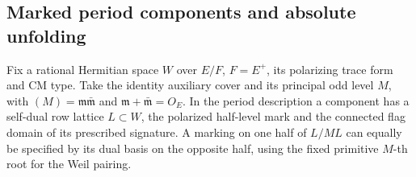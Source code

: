 \subsection{Marked period components and absolute unfolding}

Fix a rational Hermitian space \(W\) over \(E/F\), \(F=E^+\), its
polarizing trace form and CM type. Take the identity auxiliary cover
and its principal odd level \(M\), with
\((M)=\mathfrak m\bar{\mathfrak m}\) and
\(\mathfrak m+\bar{\mathfrak m}=O_E\).
In the period description a component has a self-dual row lattice
\(L\subset W\), the polarized half-level mark and the connected flag
domain of its prescribed signature. A marking on one half of \(L/ML\)
can equally be specified by its dual basis on the opposite half,
using the fixed primitive \(M\)-th root for the Weil pairing.


